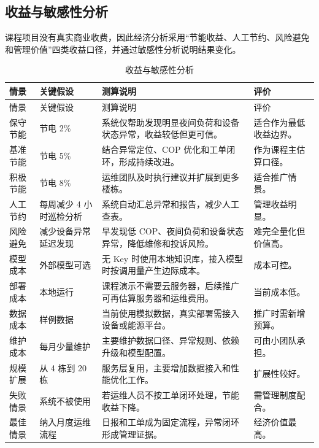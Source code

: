 \documentclass[12pt,a4paper]{ctexart}
\begin{document}
\subsection{收益与敏感性分析}
课程项目没有真实商业收费，因此经济分析采用“节能收益、人工节约、风险避免和管理价值”四类收益口径，并通过敏感性分析说明结果变化。
\begin{longtable}{L{2.4cm}L{3.0cm}L{5.6cm}L{3.8cm}}
\caption{收益与敏感性分析}\\
\toprule
情景 & 关键假设 & 测算说明 & 评价 \\
\midrule
\endfirsthead
\toprule
情景 & 关键假设 & 测算说明 & 评价 \\
\midrule
\endhead
保守节能 & 节电 2\% & 系统仅帮助发现明显夜间负荷和设备状态异常，收益较低但更可信。 & 适合作为最低收益边界。 \\
基准节能 & 节电 5\% & 结合异常定位、COP 优化和工单闭环，形成持续改进。 & 作为课程主估算口径。 \\
积极节能 & 节电 8\% & 运维团队及时执行建议并扩展到更多楼栋。 & 适合推广情景。 \\
人工节约 & 每周减少 4 小时巡检分析 & 系统自动汇总异常和报告，减少人工查表。 & 管理收益明显。 \\
风险避免 & 减少设备异常延迟发现 & 早发现低 COP、夜间负荷和设备状态异常，降低维修和投诉风险。 & 难完全量化但价值高。 \\
模型成本 & 外部模型可选 & 无 Key 时使用本地知识库，接入模型时按调用量产生边际成本。 & 成本可控。 \\
部署成本 & 本地运行 & 课程演示不需要云服务器，后续推广可再估算服务器和运维费用。 & 当前成本低。 \\
数据成本 & 样例数据 & 当前使用模拟数据，真实部署需接入设备或能源平台。 & 推广时需新增预算。 \\
维护成本 & 每月少量维护 & 主要维护数据口径、异常规则、依赖升级和模型配置。 & 可由小团队承担。 \\
规模扩展 & 从 4 栋到 20 栋 & 服务层复用，主要增加数据接入和性能优化工作。 & 扩展性较好。 \\
失败情景 & 系统不被使用 & 若运维人员不按工单闭环处理，节能收益下降。 & 需管理制度配合。 \\
最佳情景 & 纳入月度运维流程 & 日报和工单成为固定流程，异常闭环形成管理证据。 & 经济价值最高。 \\
\bottomrule
\end{longtable}
\end{document}
